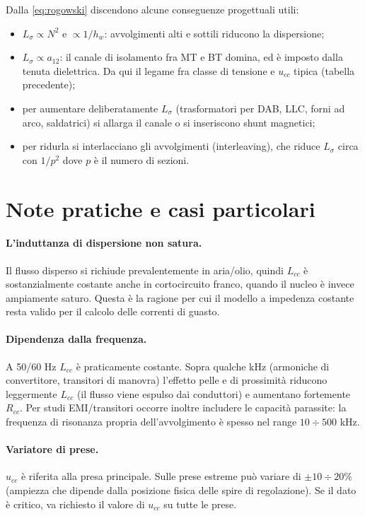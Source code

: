 \documentclass[11pt,a4paper]{article}
\begin{document}
Dalla \eqref{eq:rogowski} discendono alcune conseguenze progettuali utili:
\begin{itemize}
  \item $L_\sigma \propto N^2$ e $\propto 1/h_w$: avvolgimenti alti e sottili
        riducono la dispersione;
  \item $L_\sigma \propto a_{12}$: il canale di isolamento fra MT e BT domina, ed è
        imposto dalla tenuta dielettrica. Da qui il legame fra classe di tensione e
        $u_{cc}$ tipica (tabella precedente);
  \item per aumentare deliberatamente $L_\sigma$ (trasformatori per DAB, LLC, forni ad
        arco, saldatrici) si allarga il canale o si inseriscono shunt magnetici;
  \item per ridurla si interlacciano gli avvolgimenti (interleaving), che riduce
        $L_\sigma$ circa con $1/p^2$ dove $p$ è il numero di sezioni.
\end{itemize}

\section{Note pratiche e casi particolari}

\paragraph{L'induttanza di dispersione non satura.} Il flusso disperso si richiude
prevalentemente in aria/olio, quindi $L_{cc}$ è sostanzialmente costante anche in
cortocircuito franco, quando il nucleo è invece ampiamente saturo. Questa è la ragione per
cui il modello a impedenza costante resta valido per il calcolo delle correnti di guasto.

\paragraph{Dipendenza dalla frequenza.} A 50/60 Hz $L_{cc}$ è praticamente costante. Sopra
qualche kHz (armoniche di convertitore, transitori di manovra) l'effetto pelle e di
prossimità riducono leggermente $L_{cc}$ (il flusso viene espulso dai conduttori) e
aumentano fortemente $R_{cc}$. Per studi EMI/transitori occorre inoltre includere le
capacità parassite: la frequenza di risonanza propria dell'avvolgimento è spesso nel range
$10\div500$ kHz.

\paragraph{Variatore di prese.} $u_{cc}$ è riferita alla presa principale. Sulle prese
estreme può variare di $\pm10\div20\%$ (ampiezza che dipende dalla posizione fisica delle
spire di regolazione). Se il dato è critico, va richiesto il valore di $u_{cc}$ su tutte
le prese.
\end{document}

